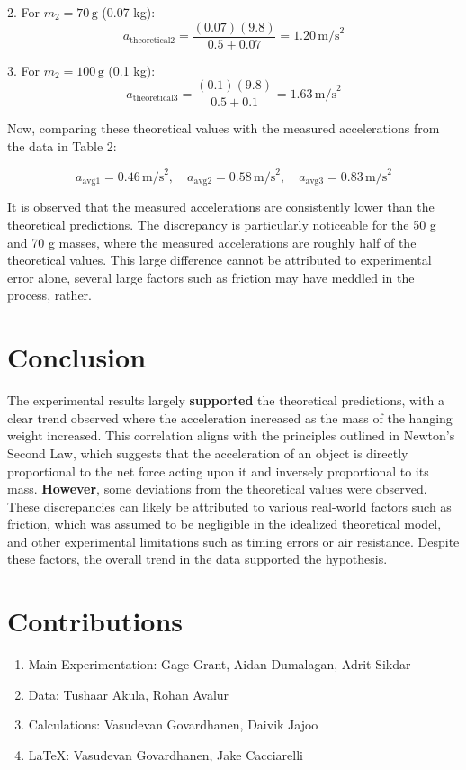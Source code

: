 \documentclass{article}
\begin{document}
2. For \(m_2 = 70 \, \text{g}\) (0.07 kg):
\[
a_{\text{theoretical2}} = \frac{(0.07)(9.8)}{0.5 + 0.07} = 1.20 \, \text{m/s}^2
\]

3. For \(m_2 = 100 \, \text{g}\) (0.1 kg):
\[
a_{\text{theoretical3}} = \frac{(0.1)(9.8)}{0.5 + 0.1} = 1.63 \, \text{m/s}^2
\]

Now, comparing these theoretical values with the measured accelerations from the data in Table 2:

\[
a_{\text{avg1}} = 0.46 \, \text{m/s}^2, \quad a_{\text{avg2}} = 0.58 \, \text{m/s}^2, \quad a_{\text{avg3}} = 0.83 \, \text{m/s}^2
\]

It is observed that the measured accelerations are consistently lower than the theoretical predictions. The discrepancy is particularly noticeable for the 50 g and 70 g masses, where the measured accelerations are roughly half of the theoretical values. This large difference cannot be attributed to experimental error alone, several large factors such as friction may have meddled in the process, rather.


\section{Conclusion}
The experimental results largely \textbf{supported} the theoretical predictions, with a clear trend observed where the acceleration increased as the mass of the hanging weight increased. This correlation aligns with the principles outlined in Newton’s Second Law, which suggests that the acceleration of an object is directly proportional to the net force acting upon it and inversely proportional to its mass. \textbf{However}, some deviations from the theoretical values were observed. These discrepancies can likely be attributed to various real-world factors such as friction, which was assumed to be negligible in the idealized theoretical model, and other experimental limitations such as timing errors or air resistance. Despite these factors, the overall trend in the data supported the hypothesis.


\section{Contributions}
\begin{enumerate}
    \item Main Experimentation: Gage Grant, Aidan Dumalagan, Adrit Sikdar
    \item Data: Tushaar Akula, Rohan Avalur
    \item Calculations: Vasudevan Govardhanen, Daivik Jajoo
    \item LaTeX: Vasudevan Govardhanen, Jake Cacciarelli
\end{enumerate}
\
\end{document}
